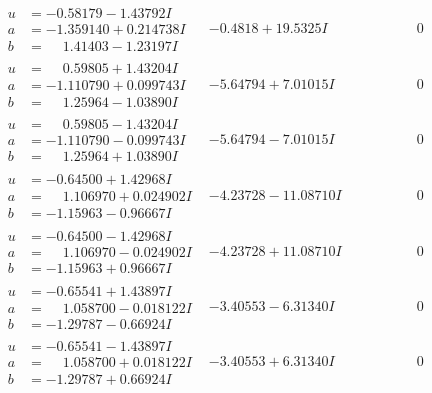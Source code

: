 \documentclass[1p]{elsarticle_modified}
\theoremstyle{definition}
\begin{document}
$$\begin{array}{c|c|c}
\begin{aligned}
u &= -0.58179 - 1.43792 I \\
a &= -1.359140 + 0.214738 I \\
b &= \phantom{-}1.41403 - 1.23197 I\end{aligned}
 & -0.4818 + 19.5325 I & \phantom{-0.000000 } 0 \\ \hline\begin{aligned}
u &= \phantom{-}0.59805 + 1.43204 I \\
a &= -1.110790 + 0.099743 I \\
b &= \phantom{-}1.25964 - 1.03890 I\end{aligned}
 & -5.64794 + 7.01015 I & \phantom{-0.000000 } 0 \\ \hline\begin{aligned}
u &= \phantom{-}0.59805 - 1.43204 I \\
a &= -1.110790 - 0.099743 I \\
b &= \phantom{-}1.25964 + 1.03890 I\end{aligned}
 & -5.64794 - 7.01015 I & \phantom{-0.000000 } 0 \\ \hline\begin{aligned}
u &= -0.64500 + 1.42968 I \\
a &= \phantom{-}1.106970 + 0.024902 I \\
b &= -1.15963 - 0.96667 I\end{aligned}
 & -4.23728 - 11.08710 I & \phantom{-0.000000 } 0 \\ \hline\begin{aligned}
u &= -0.64500 - 1.42968 I \\
a &= \phantom{-}1.106970 - 0.024902 I \\
b &= -1.15963 + 0.96667 I\end{aligned}
 & -4.23728 + 11.08710 I & \phantom{-0.000000 } 0 \\ \hline\begin{aligned}
u &= -0.65541 + 1.43897 I \\
a &= \phantom{-}1.058700 - 0.018122 I \\
b &= -1.29787 - 0.66924 I\end{aligned}
 & -3.40553 - 6.31340 I & \phantom{-0.000000 } 0 \\ \hline\begin{aligned}
u &= -0.65541 - 1.43897 I \\
a &= \phantom{-}1.058700 + 0.018122 I \\
b &= -1.29787 + 0.66924 I\end{aligned}
 & -3.40553 + 6.31340 I & \phantom{-0.000000 } 0\\

\end{array}$$
\end{document}
